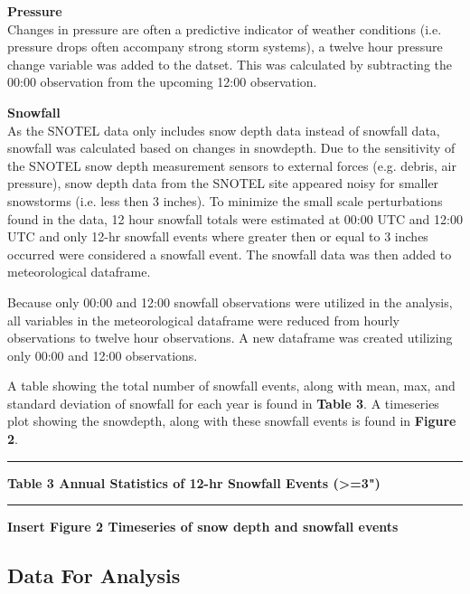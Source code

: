 \documentclass[11pt]{article}
\begin{document}
\textbf{Pressure}\\
Changes in pressure are often a predictive indicator of weather
conditions (i.e. pressure drops often accompany strong storm systems), a
twelve hour pressure change variable was added to the datset. This was
calculated by subtracting the 00:00 observation from the upcoming 12:00
observation.

\textbf{Snowfall}\\
As the SNOTEL data only includes snow depth data instead of snowfall
data, snowfall was calculated based on changes in snowdepth. Due to the
sensitivity of the SNOTEL snow depth measurement sensors to external
forces (e.g. debris, air pressure), snow depth data from the SNOTEL site
appeared noisy for smaller snowstorms (i.e. less then 3 inches). To
minimize the small scale perturbations found in the data, 12 hour
snowfall totals were estimated at 00:00 UTC and 12:00 UTC and only 12-hr
snowfall events where greater then or equal to 3 inches occurred were
considered a snowfall event. The snowfall data was then added to
meteorological dataframe.

Because only 00:00 and 12:00 snowfall observations were utilized in the
analysis, all variables in the meteorological dataframe were reduced
from hourly observations to twelve hour observations. A new dataframe
was created utilizing only 00:00 and 12:00 observations.

A table showing the total number of snowfall events, along with mean,
max, and standard deviation of snowfall for each year is found in
\textbf{Table 3}. A timeseries plot showing the snowdepth, along with
these snowfall events is found in \textbf{Figure 2}.

\begin{center}\rule{0.5\linewidth}{\linethickness}\end{center}

\textbf{Table 3 Annual Statistics of 12-hr Snowfall Events
(\textgreater{}=3")}

\begin{center}\rule{0.5\linewidth}{\linethickness}\end{center}

\textbf{Insert Figure 2 Timeseries of snow depth and snowfall events}

\subsection{Data For Analysis}\label{data-for-analysis}
\end{document}
